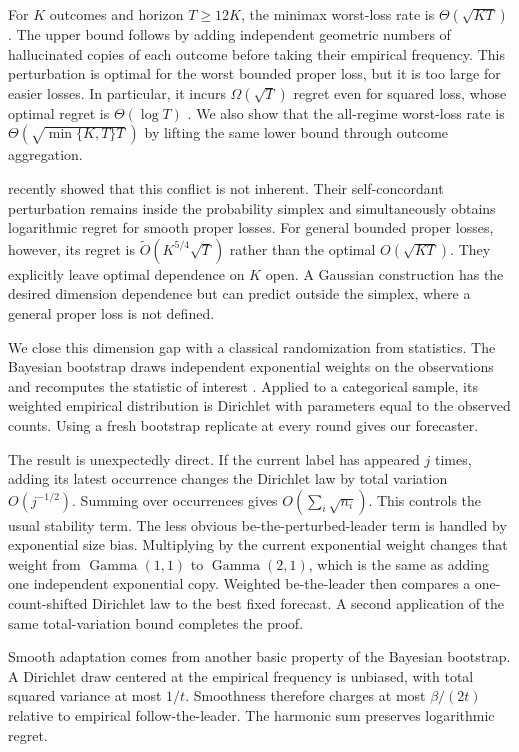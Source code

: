 \documentclass[twoside]{article}
\begin{document}
For $K$ outcomes and horizon $T\geq12K$, the minimax worst-loss rate is $\Theta(\sqrt{KT})$ \citep{luo2024}. The upper bound follows by adding independent geometric numbers of hallucinated copies of each outcome before taking their empirical frequency. This perturbation is optimal for the worst bounded proper loss, but it is too large for easier losses. In particular, it incurs $\Omega(\sqrt T)$ regret even for squared loss, whose optimal regret is $\Theta(\log T)$ \citep{frongillo2026}. We also show that the all-regime worst-loss rate is $\Theta(\!\sqrt{\min\{K,T\}T}\,)$ by lifting the same lower bound through outcome aggregation.

\citet{frongillo2026} recently showed that this conflict is not inherent. Their self-concordant perturbation remains inside the probability simplex and simultaneously obtains logarithmic regret for smooth proper losses. For general bounded proper losses, however, its regret is $\widetilde O(K^{5/4}\sqrt T)$ rather than the optimal $O(\sqrt{KT})$. They explicitly leave optimal dependence on $K$ open. A Gaussian construction has the desired dimension dependence but can predict outside the simplex, where a general proper loss is not defined.

We close this dimension gap with a classical randomization from statistics. The Bayesian bootstrap draws independent exponential weights on the observations and recomputes the statistic of interest \citep{rubin1981}. Applied to a categorical sample, its weighted empirical distribution is Dirichlet with parameters equal to the observed counts. Using a fresh bootstrap replicate at every round gives our forecaster.

The result is unexpectedly direct. If the current label has appeared $j$ times, adding its latest occurrence changes the Dirichlet law by total variation $O(j^{-1/2})$. Summing over occurrences gives $O(\sum_i\sqrt{n_i})$. This controls the usual stability term. The less obvious be-the-perturbed-leader term is handled by exponential size bias. Multiplying by the current exponential weight changes that weight from $\operatorname{Gamma}(1,1)$ to $\operatorname{Gamma}(2,1)$, which is the same as adding one independent exponential copy. Weighted be-the-leader then compares a one-count-shifted Dirichlet law to the best fixed forecast. A second application of the same total-variation bound completes the proof.

Smooth adaptation comes from another basic property of the Bayesian bootstrap. A Dirichlet draw centered at the empirical frequency is unbiased, with total squared variance at most $1/t$. Smoothness therefore charges at most $\beta/(2t)$ relative to empirical follow-the-leader. The harmonic sum preserves logarithmic regret.
\end{document}
